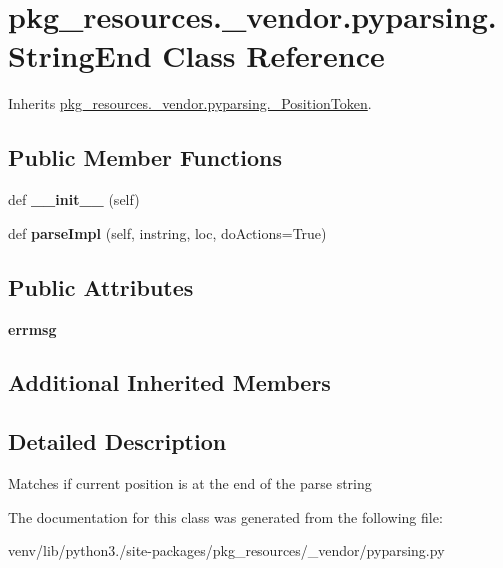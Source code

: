 \hypertarget{classpkg__resources_1_1__vendor_1_1pyparsing_1_1_string_end}{}\section{pkg\+\_\+resources.\+\_\+vendor.\+pyparsing.\+String\+End Class Reference}
\label{classpkg__resources_1_1__vendor_1_1pyparsing_1_1_string_end}


Inherits \hyperlink{classpkg__resources_1_1__vendor_1_1pyparsing_1_1___position_token}{pkg\+\_\+resources.\+\_\+vendor.\+pyparsing.\+\_\+\+Position\+Token}.

\subsection*{Public Member Functions}
\begin{DoxyCompactItemize}
\item 
\mbox{\label{classpkg__resources_1_1__vendor_1_1pyparsing_1_1_string_end_a484d51da260c59aa7066371d7d7230a3}} 
def {\bfseries \+\_\+\+\_\+init\+\_\+\+\_\+} (self)
\item 
\mbox{\label{classpkg__resources_1_1__vendor_1_1pyparsing_1_1_string_end_aa44b87bd886839763f0ad674dc419a5d}} 
def {\bfseries parse\+Impl} (self, instring, loc, do\+Actions=True)
\end{DoxyCompactItemize}
\subsection*{Public Attributes}
\begin{DoxyCompactItemize}
\item 
\mbox{\label{classpkg__resources_1_1__vendor_1_1pyparsing_1_1_string_end_aacf043cfe06aca93057d291fb7bc39ec}} 
{\bfseries errmsg}
\end{DoxyCompactItemize}
\subsection*{Additional Inherited Members}


\subsection{Detailed Description}
\begin{DoxyVerb}Matches if current position is at the end of the parse string
\end{DoxyVerb}
 

The documentation for this class was generated from the following file\+:\begin{DoxyCompactItemize}
\item 
venv/lib/python3./site-\/packages/pkg\+\_\+resources/\+\_\+vendor/pyparsing.\+py\end{DoxyCompactItemize}
